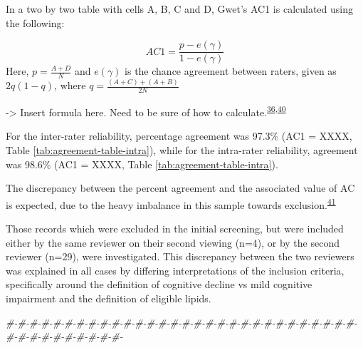 \documentclass[a4paper, twoside]{templates/ociamthesis}
\newenvironment{Shaded}{\begin{snugshade}}{\end{snugshade}}
\newcommand{\CommentTok}[1]{\textcolor[rgb]{0.56,0.35,0.01}{\textit{#1}}}
\renewenvironment{Shaded}
{
  \vspace{4pt}%
  \begin{snugshade}%
}{%
  \end{snugshade}%
  \vspace{4pt}%
}
\begin{document}
In a two by two table with cells A, B, C and D, Gwet's AC1 is calculated using the following:

\[AC1 = \frac{p-e(\gamma)}{1-e(\gamma)}\] Here, \(p = \frac{A+D}{N}\) and \(e(\gamma)\) is the chance agreement between raters, given as \(2q(1-q)\), where \(q = \frac{(A+C)+(A+B)}{2N}\)

-\textgreater{} Insert formula here. Need to be sure of how to calculate.\textsuperscript{\protect\hyperlink{ref-gwet2008}{36},\protect\hyperlink{ref-sim2005}{40}}

For the inter-rater reliability, percentage agreement was 97.3\% (AC1 = XXXX, Table \ref{tab:agreement-table-intra}), while for the intra-rater reliability, agreement was 98.6\% (AC1 = XXXX, Table \ref{tab:agreement-table-intra}).

The discrepancy between the percent agreement and the associated value of AC is expected, due to the heavy imbalance in this sample towards exclusion.\textsuperscript{\protect\hyperlink{ref-feinstein1990}{41}}

Those records which were excluded in the initial screening, but were included either by the same reviewer on their second viewing (n=4), or by the second reviewer (n=29), were investigated. This discrepancy between the two reviewers was explained in all cases by differing interpretations of the inclusion criteria, specifically around the definition of cognitive decline vs mild cognitive impairment and the definition of eligible lipids.

\begin{Shaded}
\begin{Highlighting}[]
\CommentTok{\#{-}\#{-}\#{-}\#{-}\#{-}\#{-}\#{-}\#{-}\#{-}\#{-}\#{-}\#{-}\#{-}\#{-}\#{-}\#{-}\#{-}\#{-}\#{-}\#{-}\#{-}\#{-}\#{-}\#{-}\#{-}\#{-}\#{-}\#{-}\#{-}\#{-}\#{-}\#{-}\#{-}\#{-}\#{-}\#{-}\#{-}\#{-}\#{-}\#{-}}
\end{Highlighting}
\end{Shaded}
\end{document}
